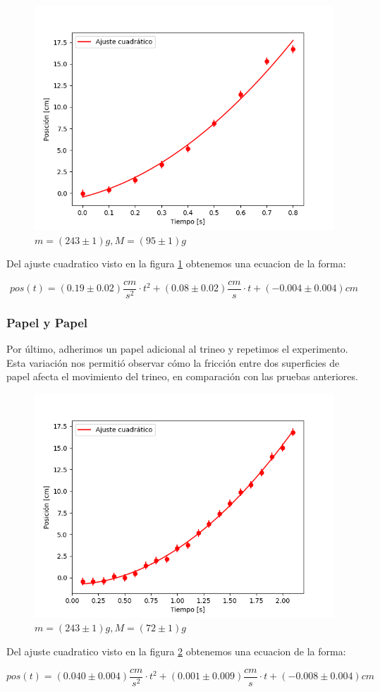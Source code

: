 \documentclass[12pt,a4]{article}
\begin{document}
\begin{figure}[H]
    \centering
    \includegraphics[width=0.44\linewidth]{ajuste2_PisoHojaM_OP.png}
    \caption{$m = (243 \pm 1) g, M = (95 \pm 1) g$}
    \label{fig:M_OP piso hoja}
\end{figure}


Del ajuste cuadratico visto en la figura \ref{fig:M_OP piso hoja} obtenemos una ecuacion de la forma:

\[
pos(t) = (0.19 \pm 0.02) \frac{cm}{s^2} \cdot t^2 + (0.08 \pm 0.02)\frac{cm}{s} \cdot t + (-0.004 \pm 0.004) cm
\]

\subsubsection*{Papel y Papel}

Por último, adherimos un papel adicional al trineo y repetimos el experimento. Esta variación nos permitió observar cómo la fricción entre dos superficies de papel afecta el movimiento del trineo, en comparación con las pruebas anteriores.

\begin{figure}[H]
    \centering
    \includegraphics[width=0.44\linewidth]{ajuste2_PapelPapelM_O.png}
    \caption{$m = (243 \pm 1) g, M = (72 \pm 1) g$}
    \label{fig:M_O papel papel}
\end{figure}

Del ajuste cuadratico visto en la figura \ref{fig:M_O papel papel} obtenemos una ecuacion de la forma:

\[
pos(t) = (0.040 \pm 0.004) \frac{cm}{s^2} \cdot t^2 + (0.001 \pm 0.009) \frac{cm}{s} \cdot t + (-0.008 \pm 0.004) cm
\]
\end{document}
